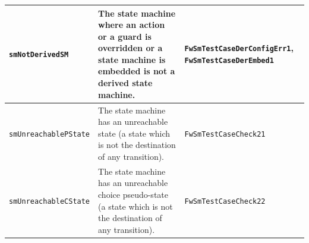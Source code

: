 \documentclass[a4paper,10pt]{article}
\begin{document}
\begin{longtable}{|p{3cm}|p{3.7cm}|p{4.5cm}|}
\hline
\texttt{smNotDerivedSM} & The state machine where an action or a guard is overridden or a state machine is embedded is not a derived state machine. 
& \texttt{FwSmTestCaseDerConfigErr1}, \texttt{FwSmTestCaseDerEmbed1} \\
\hline
\texttt{smUnreachablePState} & The state machine has an unreachable state (a state which is not the destination of any transition). 
& \texttt{FwSmTestCaseCheck21} \\
\hline
\texttt{smUnreachableCState} & The state machine has an unreachable choice pseudo-state (a state which is not the destination of any transition). 
& \texttt{FwSmTestCaseCheck22} \\
\hline
\end{longtable}

\end{document}
